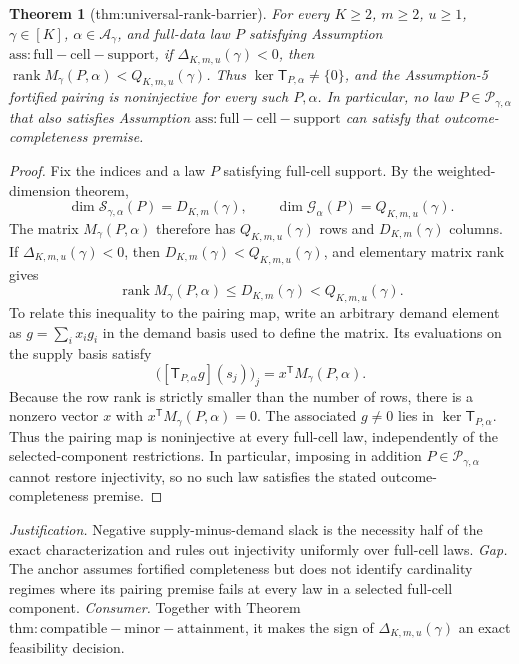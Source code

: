 \documentclass{article}
\newtheorem{theorem}{Theorem}
\begin{document}
\begin{theorem}[thm:universal-rank-barrier]\label{thm:universal-rank-barrier}
For every \(K\ge2\), \(m\ge2\), \(u\ge1\), \(\gamma\in[K]\), \(\alpha\in\mathcal A_\gamma\), and full-data law \(P\) satisfying Assumption \(\mathrm{ass:full-cell-support}\), if \(\Delta_{K,m,u}(\gamma)<0\), then \(\operatorname{rank}M_\gamma(P,\alpha)<Q_{K,m,u}(\gamma)\). Thus \(\ker\mathsf T_{P,\alpha}\ne\{0\}\), and the Assumption-5 fortified pairing is noninjective for every such \(P,\alpha\). In particular, no law \(P\in\mathcal P_{\gamma,\alpha}\) that also satisfies Assumption \(\mathrm{ass:full-cell-support}\) can satisfy that outcome-completeness premise.
\end{theorem}
\begin{proof}
Fix the indices and a law \(P\) satisfying full-cell support. By the weighted-dimension theorem,
\[\dim\mathcal S_{\gamma,\alpha}(P)=D_{K,m}(\gamma),\qquad \dim\mathcal G_\alpha(P)=Q_{K,m,u}(\gamma).\]
The matrix \(M_\gamma(P,\alpha)\) therefore has \(Q_{K,m,u}(\gamma)\) rows and \(D_{K,m}(\gamma)\) columns. If \(\Delta_{K,m,u}(\gamma)<0\), then \(D_{K,m}(\gamma)<Q_{K,m,u}(\gamma)\), and elementary matrix rank gives
\[\operatorname{rank}M_\gamma(P,\alpha)\le D_{K,m}(\gamma)<Q_{K,m,u}(\gamma).\]
To relate this inequality to the pairing map, write an arbitrary demand element as \(g=\sum_i x_i g_i\) in the demand basis used to define the matrix. Its evaluations on the supply basis satisfy
\[\bigl([\mathsf T_{P,\alpha}g](s_j)\bigr)_j=x^{\mathsf T}M_\gamma(P,\alpha).\]
Because the row rank is strictly smaller than the number of rows, there is a nonzero vector \(x\) with \(x^{\mathsf T}M_\gamma(P,\alpha)=0\). The associated \(g\ne0\) lies in \(\ker\mathsf T_{P,\alpha}\). Thus the pairing map is noninjective at every full-cell law, independently of the selected-component restrictions. In particular, imposing in addition \(P\in\mathcal P_{\gamma,\alpha}\) cannot restore injectivity, so no such law satisfies the stated outcome-completeness premise.
\end{proof}
\par\smallskip\noindent \textit{Justification.} Negative supply-minus-demand slack is the necessity half of the exact characterization and rules out injectivity uniformly over full-cell laws. \textit{Gap.} The anchor assumes fortified completeness but does not identify cardinality regimes where its pairing premise fails at every law in a selected full-cell component. \textit{Consumer.} Together with Theorem \(\mathrm{thm:compatible-minor-attainment}\), it makes the sign of \(\Delta_{K,m,u}(\gamma)\) an exact feasibility decision.
\end{document}
